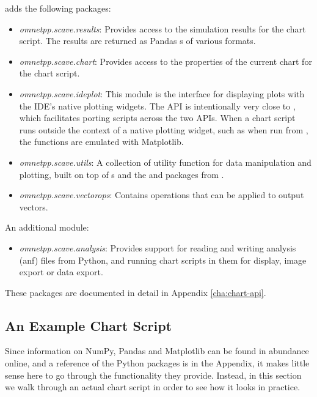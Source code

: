 {\opp} adds the following packages:

\begin{itemize}
  \item \textit{omnetpp.scave.results}: Provides access to the simulation
    results for the chart script. The results are returned as Pandas
    s of various formats.
  \item \textit{omnetpp.scave.chart}: Provides access to the properties of the
    current chart for the chart script.
  \item \textit{omnetpp.scave.ideplot}: This module is the interface for displaying
    plots with the IDE's native plotting widgets. The API is intentionally very
    close to , which facilitates porting scripts across
    the two APIs. When a chart script runs outside the context of a native
    plotting widget, such as when run from , the functions
    are emulated with Matplotlib.
  \item \textit{omnetpp.scave.utils}: A collection of utility function for data
    manipulation and plotting, built on top of s and the 
    and  packages from .
  \item \textit{omnetpp.scave.vectorops}: Contains operations that can be
    applied to output vectors.
\end{itemize}

An additional module:

\begin{itemize}
  \item \textit{omnetpp.scave.analysis}: Provides support for reading and writing
   analysis (anf) files from Python, and running chart scripts in them for display,
   image export or data export.
\end{itemize}

These packages are documented in detail in Appendix \ref{cha:chart-api}.


\subsection{An Example Chart Script}
\label{sec:ana-sim:example_chart_script}

Since information on NumPy, Pandas and Matplotlib can be found in abundance
online, and a reference of the  Python packages is in the
Appendix, it makes little sense here to go through the functionality they
provide. Instead, in this section we walk through an actual chart script in
order to see how it looks in practice.

